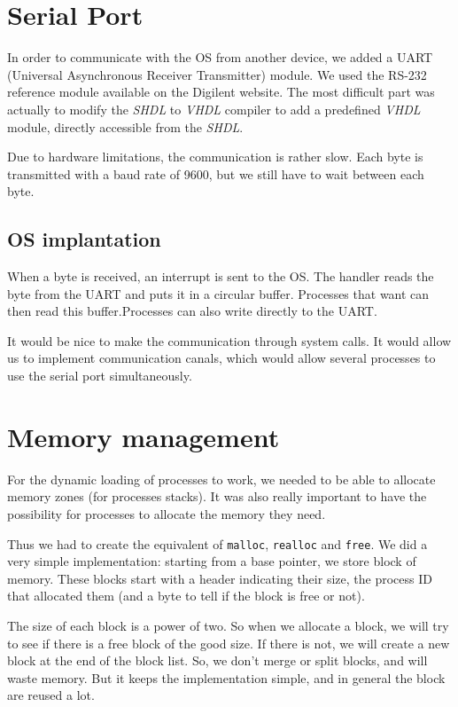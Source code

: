 \documentclass[openany, a4paper]{book}
\begin{document}
    \section{Serial Port}
      In order to communicate with the OS from another device, we added a UART
      (Universal Asynchronous Receiver Transmitter) module. We used the RS-232
      reference module available on the Digilent website. The most difficult
      part was actually to modify the \emph{SHDL} to \emph{VHDL} compiler to add
      a predefined \emph{VHDL} module, directly accessible from the \emph{SHDL}.

      Due to hardware limitations, the communication is rather slow. Each byte
      is transmitted with a baud rate of 9600, but we still have to wait
      between each byte.

      \subsection{OS implantation}
        When a byte is received, an interrupt is sent to the OS. The handler
        reads the byte from the UART and puts it in a circular buffer.
        Processes that want can then read this buffer.Processes can also write
        directly to the UART.

        It would be nice to make the communication through system calls. It
        would allow us to implement communication canals, which would allow
        several processes to use the serial port simultaneously.

    \section{Memory management}
      For the dynamic loading of processes to work, we needed to be able to
      allocate memory zones (for processes stacks). It was also really important
      to have the possibility for processes to allocate the memory they need.

      Thus we had to create the equivalent of \verb+malloc+, \verb+realloc+ and
      \verb+free+. We did a very
      simple implementation: starting from a base pointer, we store block of
      memory. These blocks start with a header indicating their size, the
      process ID that allocated them (and a byte to tell if the block is free or
      not).

      The size of each block is a power of two. So when we allocate a block, we
      will try to see if there is a free block of the good size. If there is
      not, we will create a new block at the end of the block list.
      So, we don't merge or split blocks, and will waste memory. But it keeps
      the implementation simple, and in general the block are reused a lot.
\end{document}
